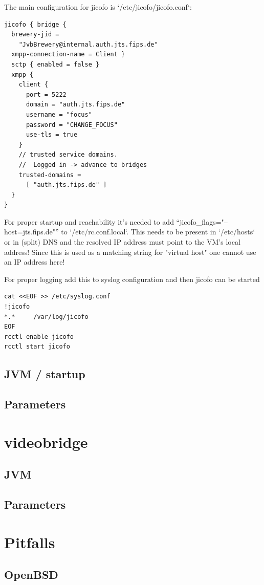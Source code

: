 \documentclass[conference]{IEEEtran}
\begin{document}
The main configuration for jicofo is `/etc/jicofo/jicofo.conf`:
\begin{verbatim}
jicofo { bridge {
  brewery-jid = 
    "JvbBrewery@internal.auth.jts.fips.de"
  xmpp-connection-name = Client }
  sctp { enabled = false }
  xmpp {
    client {
      port = 5222
      domain = "auth.jts.fips.de"
      username = "focus"
      password = "CHANGE_FOCUS"
      use-tls = true
    }
    // trusted service domains. 
    //  Logged in -> advance to bridges
    trusted-domains = 
      [ "auth.jts.fips.de" ]
  }
}
\end{verbatim}
For proper startup and reachability it's needed to add ``jicofo\_flags="--host=jts.fips.de"''
to `/etc/rc.conf.local`. This needs to be present in `/etc/hosts` or in (split) DNS and the
resolved IP address must point to the VM's local address! Since this is used as a matching
string for "virtual host" one cannot use an IP address here!

For proper logging add this to syslog configuration and then jicofo can be started
\begin{verbatim}
cat <<EOF >> /etc/syslog.conf
!jicofo
*.*     /var/log/jicofo
EOF
rcctl enable jicofo
rcctl start jicofo
\end{verbatim}

\subsection{JVM / startup}
\subsection{Parameters}
\section{videobridge}
\subsection{JVM}
\subsection{Parameters}
\section{Pitfalls}
\subsection{OpenBSD}
\end{document}
